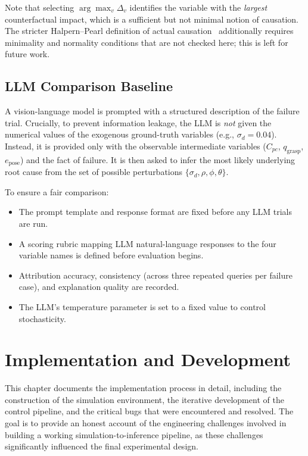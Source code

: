 \documentclass[11pt,a4paper]{report}
\begin{document}
Note that selecting $\arg\max_v \Delta_v$ identifies the variable with the \emph{largest} counterfactual impact, which is a sufficient but not minimal notion of causation. The stricter Halpern--Pearl definition of actual causation~\cite{halpern2005causes} additionally requires minimality and normality conditions that are not checked here; this is left for future work.

\section{LLM Comparison Baseline}
\label{sec:llm_baseline}

A vision-language model is prompted with a structured description of the failure trial. Crucially, to prevent information leakage, the LLM is \emph{not} given the numerical values of the exogenous ground-truth variables (e.g., $\sigma_d = 0.04$). Instead, it is provided only with the observable intermediate variables ($C_{pc}$, $q_{\text{grasp}}$, $e_{\text{pose}}$) and the fact of failure. It is then asked to infer the most likely underlying root cause from the set of possible perturbations $\{\sigma_d, \rho, \phi, \theta\}$.

To ensure a fair comparison:
\begin{itemize}
  \item The prompt template and response format are fixed before any LLM trials are run.
  \item A scoring rubric mapping LLM natural-language responses to the four variable names is defined before evaluation begins.
  \item Attribution accuracy, consistency (across three repeated queries per failure case), and explanation quality are recorded.
  \item The LLM's temperature parameter is set to a fixed value to control stochasticity.
\end{itemize}


\chapter{Implementation and Development}
\label{ch:implementation}

This chapter documents the implementation process in detail, including the construction of the simulation environment, the iterative development of the control pipeline, and the critical bugs that were encountered and resolved. The goal is to provide an honest account of the engineering challenges involved in building a working simulation-to-inference pipeline, as these challenges significantly influenced the final experimental design.
\end{document}
